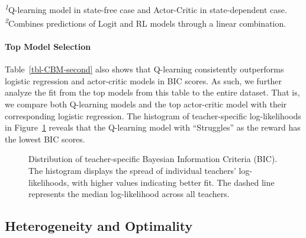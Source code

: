 \documentclass[
  number,
  preprint,
  3p,
  onecolumn]{elsarticle}
\let\oldparagraph\paragraph
\renewcommand{\paragraph}[1]{\oldparagraph{#1}\mbox{}}
\begin{document}
\begin{minipage}{\linewidth}
\textsuperscript{\textit{1}}Q-learning model in state-free case and Actor-Critic in state-dependent case.\\
\textsuperscript{\textit{2}}Combines predictions of Logit and RL models through a linear combination.\\
\end{minipage}

\paragraph{Top Model Selection}\label{top-model-selection}

Table~\ref{tbl-CBM-second} also shows that Q-learning consistently
outperforms logistic regression and actor-critic models in BIC scores.
As such, we further analyze the fit from the top models from this table
to the entire dataset. That is, we compare both Q-learning models and
the top actor-critic model with their corresponding logistic regression.
The histogram of teacher-specific log-likelihoods in
Figure~\ref{fig-loglik-histogram} reveals that the Q-learning model with
``Struggles'' as the reward has the lowest BIC scores.

\begin{figure}


\caption{\label{fig-loglik-histogram}Distribution of teacher-specific
Bayesian Information Criteria (BIC). The histogram displays the spread
of individual teachers' log-likelihoods, with higher values indicating
better fit. The dashed line represents the median log-likelihood across
all teachers.}

\end{figure}%

\subsection{Heterogeneity and
Optimality}\label{heterogeneity-and-optimality}
\end{document}
